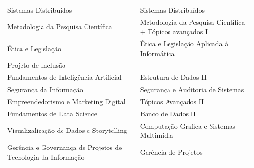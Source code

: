 \documentclass[11pt,fleqn]{book} %
\begin{document}
\begin{table}[]
{\begin{tabular}{@{}l|l@{}}
			Sistemas Distribuídos                                         & Sistemas Distribuídos                                                     \\
			Metodologia da Pesquisa Científica                            & Metodologia da Pesquisa Científica + Tópicos avançados I                  \\
			Ética e Legislação                                            & Ética e Legislação Aplicada à Informática                                 \\
			Projeto de Inclusão                                           & -                                                                         \\
			Fundamentos de Inteligência Artificial                        & Estrutura de Dados II                                                     \\
			Segurança da Informação                                       & Segurança e Auditoria de Sistemas                                         \\
			Empreendedorismo e Marketing Digital                          & Tópicos Avançados II                                                      \\
			Fundamentos de Data Science                                   & Banco de Dados II                                                         \\
			Visualizalização de Dados e Storytelling                      & Computação Gráfica e Sistemas Multimídia                                  \\
			Gerência e Governança de Projetos de Tecnologia da Informação & Gerência de Projetos                                                      \\ \bottomrule
		\end{tabular}%
	}
\end{table}
\end{document}
